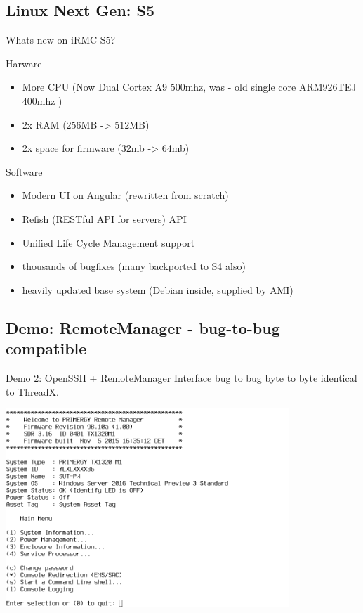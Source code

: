 \documentclass{beamer}
\begin{document}
  \subsection{Linux Next Gen: S5}
  \begin{frame}
	  \alert{Whats new on iRMC S5?}

	  \begin{block}{Harware}
	  \begin{itemize}
		  \item More CPU (Now Dual Cortex A9 500mhz, was - old single core ARM926TEJ 400mhz )
		  \item 2x RAM (256MB -> 512MB)
		  \item 2x space for firmware (32mb -> 64mb)
	  \end{itemize}
	  \end{block}

	  \pause

	  \begin{block}{Software}
		  \begin{itemize}
			  \item Modern UI on Angular (rewritten from scratch)
			  \item Refish (RESTful API for servers) API
			  \item Unified Life Cycle Management support
			  \item thousands of bugfixes (many backported to S4 also)
			  \item heavily updated base system (Debian inside, supplied by AMI) 
		  \end{itemize}
	  \end{block}


  \end{frame}

  \subsection{Demo: RemoteManager - bug-to-bug compatible}
  \begin{frame}{Demo 2: OpenSSH + RemoteManager}
	  \alert{Interface \st{bug to bug} byte to byte identical to ThreadX}.

	  \begin{center}
		  \includegraphics[width=0.8\textwidth]{screenshot/remote-manager.png}
	  \end{center}

  \end{frame}
\end{document}
